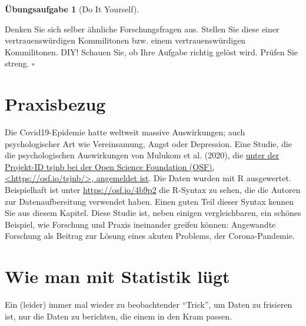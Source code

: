 \documentclass[
  letterpaper,
]{scrbook}
\theoremstyle{definition}
\newtheorem{exercise}{Übungsaufgabe}[chapter]
\theoremstyle{definition}
\theoremstyle{definition}
\theoremstyle{remark}
\begin{document}
\begin{exercise}[Do It
Yourself]\protect\hypertarget{exr-diy}{}\label{exr-diy}

Denken Sie sich selber ähnliche Forschungsfragen aus. Stellen Sie diese
einer vertrauenswürdigen Kommilitonen bzw. einem vertrauenswürdigen
Kommilitonen. DIY! Schauen Sie, ob Ihre Aufgabe richtig gelöst wird.
Prüfen Sie streng. \(\square\)

\end{exercise}

\section{Praxisbezug}\label{praxisbezug-2}

Die Covid19-Epidemie hatte weltweit massive Auswirkungen; auch
psychologischer Art wie Vereinsamung, Angst oder Depression. Eine
Studie, die die psychologischen Auswirkungen von Mulukom et al. (2020),
die \href{https://osf.io/tsjnb/}{unter der Projekt-ID tsjnb bei der Open
Science Foundation (OSF), \textless https://osf.io/tsjnb/\textgreater,
angemeldet ist}. Die Daten wurden mit R ausgewertet. Beispielhaft ist
unter \url{https://osf.io/4b9p2} die R-Syntax zu sehen, die die Autoren
zur Datenaufbereitung verwendet haben. Einen guten Teil dieser Syntax
kennen Sie aus diesem Kapitel. Diese Studie ist, neben einigen
vergleichbaren, ein schönes Beispiel, wie Forschung und Praxis
ineinander greifen können: Angewandte Forschung als Beitrag zur Lösung
eines akuten Problems, der Corona-Pandemie.

\section{Wie man mit Statistik
lügt}\label{wie-man-mit-statistik-luxfcgt-1}

Ein (leider) immer mal wieder zu beobachtender \enquote{Trick}, um Daten
zu frisieren ist, nur die Daten zu berichten, die einem in den Kram
passen.
\end{document}
